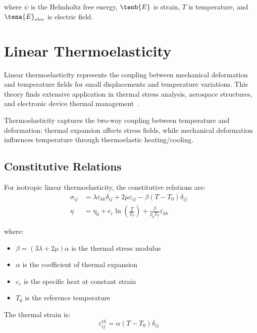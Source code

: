 where $\psi$ is the Helmholtz free energy, $\tenb{E}$ is strain, $T$ is temperature, and $\tena{E}_{elec}$ is electric field.

\section{Linear Thermoelasticity}

Linear thermoelasticity represents the coupling between mechanical deformation and temperature fields for small displacements and temperature variations. This theory finds extensive application in thermal stress analysis, aerospace structures, and electronic device thermal management~\autocite{Sadd.2019}.

\begin{keypoint}
Thermoelasticity captures the two-way coupling between temperature and deformation: thermal expansion affects stress fields, while mechanical deformation influences temperature through thermoelastic heating/cooling.
\end{keypoint}

\subsection{Constitutive Relations}

For isotropic linear thermoelasticity, the constitutive relations are:
\begin{align}
\sigma_{ij} &= \lambda \varepsilon_{kk} \delta_{ij} + 2\mu \varepsilon_{ij} - \beta (T - T_0) \delta_{ij}\\
\eta &= \eta_0 + c_\varepsilon \ln\left(\frac{T}{T_0}\right) + \frac{\beta}{\rho_0 T_0} \varepsilon_{kk}
\end{align}

where:
\begin{itemize}
\item $\beta = (3\lambda + 2\mu)\alpha$ is the thermal stress modulus
\item $\alpha$ is the coefficient of thermal expansion
\item $c_\varepsilon$ is the specific heat at constant strain
\item $T_0$ is the reference temperature
\end{itemize}

The thermal strain is:
\begin{equation}
\varepsilon_{ij}^{th} = \alpha (T - T_0) \delta_{ij}
\end{equation}

